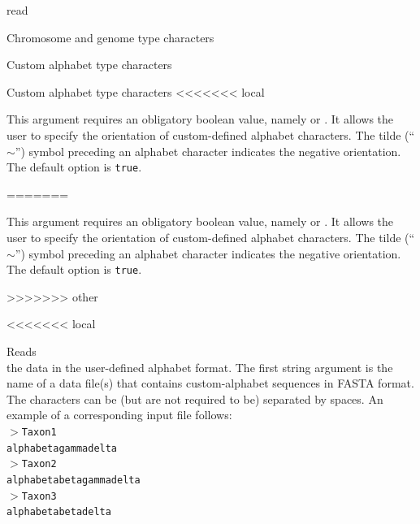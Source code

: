 \begin{command}{read}{}
\begin{arguments}
\begin{argumentgroup}{Chromosome and genome type characters}
\begin{argumentgroup}{Custom alphabet type characters}
\begin{argumentgroup}{Custom alphabet type characters}
<<<<<<< local
         \begin{description}
	{This argument requires an obligatory boolean value, namely  or 
	. It allows the user to specify the orientation of custom-defined alphabet
	characters. The tilde (``$\sim$'') symbol preceding an alphabet character indicates the negative 
	orientation. The default option is \texttt{true}. }
	{}
	\end{description}
=======
            \begin{description}
                    {This argument requires an obligatory boolean value, namely
                     or .  It allows the user
                    to specify the orientation of custom-defined alphabet
                    characters. The tilde (``$\sim$'') symbol preceding an
                    alphabet character indicates the negative orientation. The
                    default option is \texttt{true}. }
                    {}
            \end{description}
>>>>>>> other
      
<<<<<<< local
            {Reads \\ the data in the user-defined alphabet format. The first string argument is
            the name of a data file(s) that contains custom-alphabet sequences in FASTA format. 
            The characters can be (but are not required to be) separated by spaces.
            An example of a corresponding input file follows:\\
               
          \texttt{$>$Taxon1\\
	\indent alphabetagammadelta\\
	\indent $>$Taxon2\\
	\indent alphabetabetagammadelta\\
	\indent $>$Taxon3\\
	\indent alphabetabetadelta\\}
	
}
\end{argumentgroup}
\end{argumentgroup}
\end{argumentgroup}
\end{arguments}
\end{command}
